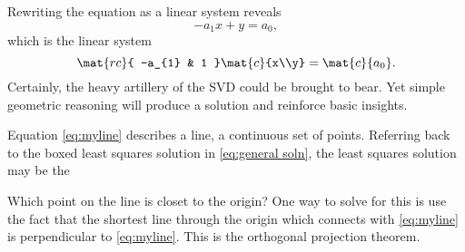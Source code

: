 Rewriting the equation as a linear system reveals
  \begin{equation*}   %
      -a_{1} x + y = a_{0},
  \end{equation*}
which is the linear system
  \begin{equation*}   %
    \mat{rc}{ -a_{1} & 1 } \mat{c}{x\\y} = \mat{c}{a_{0}}.
  \end{equation*}
Certainly, the heavy artillery of the SVD could be brought to bear. Yet simple geometric reasoning will produce a solution and reinforce basic insights.

Equation \eqref{eq:myline} describes a line, a continuous set of points. Referring back to the boxed least squares solution in \eqref{eq:general soln}, the least squares solution may be the 

Which point on the line is closet to the origin? One way to solve for this is use the fact that the shortest line through the origin which connects with \eqref{eq:myline} is perpendicular to \eqref{eq:myline}. This is the orthogonal projection theorem.

